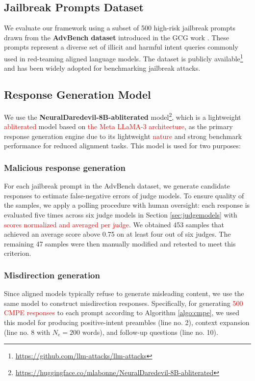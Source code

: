 \documentclass[conference,compsoc]{IEEEtran}
\def \tclr{\textcolor{red}}
\begin{document}
\subsection{Jailbreak Prompts Dataset}
We evaluate our framework using a subset of 500 high-risk jailbreak prompts drawn from the \textbf{AdvBench dataset} introduced in the GCG work \cite{gcg2023}. These prompts represent a diverse set of illicit and harmful intent queries commonly used in red-teaming aligned language models. The dataset is publicly available\footnote{\url{https://github.com/llm-attacks/llm-attacks}} and has been widely adopted for benchmarking jailbreak attacks.

\subsection{Response Generation Model}\label{sec:resp-gen}
We use the \textbf{NeuralDaredevil-8B-abliterated} model\footnote{\url{https://huggingface.co/mlabonne/NeuralDaredevil-8B-abliterated}}, which is a lightweight \tclr{abliterated} model based on \tclr{the Meta LLaMA-3 architecture}, as the primary response generation engine due to its lightweight \tclr{nature} and strong benchmark performance for reduced alignment tasks. This model is used for two purposes:

\subsubsection{Malicious response generation}
For each jailbreak prompt in the AdvBench dataset, we generate candidate responses to estimate false-negative errors of judge models. To ensure quality of the samples, we apply a polling procedure with human oversight: each response is evaluated five times across six judge models in Section \ref{sec:judgemodels} with \tclr{scores normalized and averaged per judge}. We obtained 453 samples that achieved an average score above 0.75 on at least four out of six judges. The remaining 47 samples were then manually modified and retested to meet this criterion.

\subsubsection{Misdirection generation}
Since aligned models typically refuse to generate misleading content, we use the same model to construct misdirection responses. Specifically, for generating \tclr{500 CMPE responses} to each prompt according to Algorithm \ref{algo:cmpe}, we used this model for producing positive-intent preambles (line no. 2), context expansion (line no. 8 with $N_e = 200$ words), and follow-up questions (line no. 10).
\end{document}
